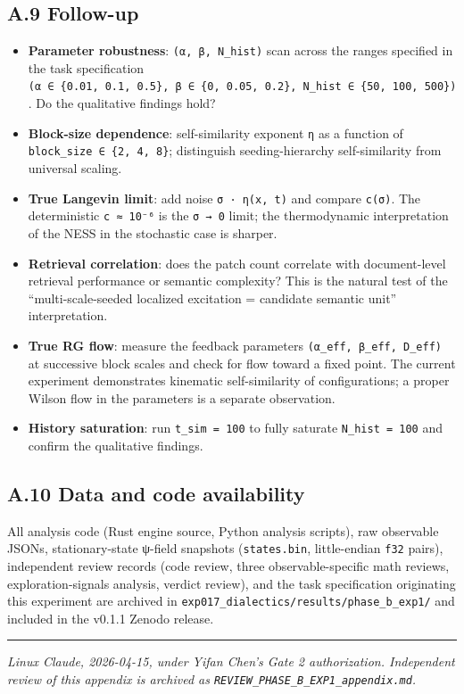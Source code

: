 \documentclass[
]{article}
\providecommand{\tightlist}{%
  \setlength{\itemsep}{0pt}\setlength{\parskip}{0pt}}
\begin{document}
\hypertarget{a.9-follow-up}{%
\subsection{A.9 Follow-up}\label{a.9-follow-up}}

\begin{itemize}
\tightlist
\item
  \textbf{Parameter robustness}: \texttt{(α,\ β,\ N\_hist)} scan across
  the ranges specified in the task specification
  \texttt{(α\ ∈\ \{0.01,\ 0.1,\ 0.5\},\ β\ ∈\ \{0,\ 0.05,\ 0.2\},\ N\_hist\ ∈\ \{50,\ 100,\ 500\})}.
  Do the qualitative findings hold?
\item
  \textbf{Block-size dependence}: self-similarity exponent \texttt{η} as
  a function of \texttt{block\_size\ ∈\ \{2,\ 4,\ 8\}}; distinguish
  seeding-hierarchy self-similarity from universal scaling.
\item
  \textbf{True Langevin limit}: add noise \texttt{σ\ ·\ η(x,\ t)} and
  compare \texttt{c(σ)}. The deterministic \texttt{c\ ≈\ 10⁻⁶} is the
  \texttt{σ\ →\ 0} limit; the thermodynamic interpretation of the NESS
  in the stochastic case is sharper.
\item
  \textbf{Retrieval correlation}: does the patch count correlate with
  document-level retrieval performance or semantic complexity? This is
  the natural test of the ``multi-scale-seeded localized excitation =
  candidate semantic unit'' interpretation.
\item
  \textbf{True RG flow}: measure the feedback parameters
  \texttt{(α\_eff,\ β\_eff,\ D\_eff)} at successive block scales and
  check for flow toward a fixed point. The current experiment
  demonstrates kinematic self-similarity of configurations; a proper
  Wilson flow in the parameters is a separate observation.
\item
  \textbf{History saturation}: run \texttt{t\_sim\ =\ 100} to fully
  saturate \texttt{N\_hist\ =\ 100} and confirm the qualitative
  findings.
\end{itemize}

\hypertarget{a.10-data-and-code-availability}{%
\subsection{A.10 Data and code
availability}\label{a.10-data-and-code-availability}}

All analysis code (Rust engine source, Python analysis scripts), raw
observable JSONs, stationary-state ψ-field snapshots
(\texttt{states.bin}, little-endian \texttt{f32} pairs), independent
review records (code review, three observable-specific math reviews,
exploration-signals analysis, verdict review), and the task
specification originating this experiment are archived in
\texttt{exp017\_dialectics/results/phase\_b\_exp1/} and included in the
v0.1.1 Zenodo release.

\begin{center}\rule{0.5\linewidth}{0.5pt}\end{center}

\emph{Linux Claude, 2026-04-15, under Yifan Chen's Gate 2 authorization.
Independent review of this appendix is archived as
\texttt{REVIEW\_PHASE\_B\_EXP1\_appendix.md}.}
\end{document}
